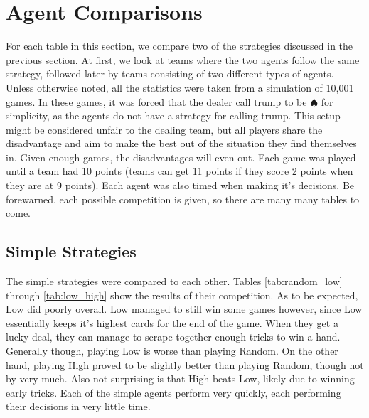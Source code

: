 
\section{Agent Comparisons}

For each table in this section, we compare two of the strategies discussed in the previous section. At first, we look at
teams where the two agents follow the same strategy, followed later by teams consisting of two different types of agents.
Unless otherwise noted, all the statistics were taken from a simulation of 10,001 games. In these games, it was forced
that the dealer call trump to be $\spadesuit$ for simplicity, as the agents do not have a strategy for calling trump.
This setup might be considered unfair to the dealing team, but all players share the disadvantage and aim to make the best
out of the situation they find themselves in. Given enough games, the disadvantages will even out.
Each game was played until a team had 10 points (teams can get 11 points if they score 2 points when they are at 9 points).
Each agent was also timed when making it's decisions. Be forewarned, each possible competition is given, so there are many many tables to come.


\subsection{Simple Strategies}

The simple strategies were compared to each other. Tables \ref{tab:random_low} through \ref{tab:low_high} show the results of their competition.
As to be expected, Low did poorly overall. Low managed to still win some games however, since Low essentially keeps it's highest cards for the
end of the game. When they get a lucky deal, they can manage to scrape together enough tricks to win a hand. Generally though, playing Low is
worse than playing Random. On the other hand, playing High proved to be slightly better than playing Random, though not by very much.
Also not surprising is that High beats Low, likely due to winning early tricks. Each of the simple agents perform very quickly, each performing
their decisions in very little time.

